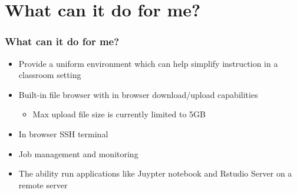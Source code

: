 \section[Why]{What can it do for me?}
\begin{frame}
	\frametitle{What can it do for me?}
	\begin{itemize}
	\item Provide a uniform environment which can help simplify instruction in a classroom setting
	\item Built-in file browser with in browser download/upload capabilities
		\begin{itemize}
		\item Max upload file size is currently limited to 5GB
		\end{itemize}
	\item In browser SSH terminal
	\item Job management and monitoring
	\item The ability run applications like Juypter notebook and Rstudio Server on a remote server
	\end{itemize}
\end{frame}

